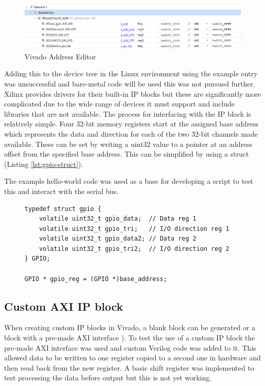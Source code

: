 \begin{figure}[H]
	\centering
	\includegraphics[scale=0.6]{address_editor.png}
	\caption{Vivado Address Editor}
	\label{fig:address_editor}
\end{figure}

Adding this to the device tree in the Linux environment using the example entry was unsuccessful and bare-metal code will be used this was not pursued further. Xilinx provides drivers \cite{xilinx_gpio_driver} for their built-in IP blocks but these are significantly more complicated due to the wide range of devices it must support and include libraries that are not available. The process for interfacing with the IP block is relatively simple. Four 32-bit memory registers start at the assigned base address which represents the data and direction for each of the two 32-bit channels made available. These can be set by writing a uint32 value to a pointer at an address offset from the specified base address. This can be simplified by using a struct (Listing \ref{lst:gpio-struct}).

The example hello-world code was used as a base for developing a script to test this and interact with the serial bus.

\begin{figure}[h]
\begin{lstlisting}[style=CStyle, caption={Definition of a structure to access virtual memory addresses.}, label={lst:gpio-struct}]
typedef struct gpio {
	volatile uint32_t gpio_data;  // Data reg 1
	volatile uint32_t gpio_tri;   // I/O direction reg 1
	volatile uint32_t gpio_data2; // Data reg 2
	volatile uint32_t gpio_tri2;  // I/O direction reg 2
} GPIO;

GPIO * gpio_reg = (GPIO *)base_address;
\end{lstlisting}
\end{figure}

\subsection{Custom AXI IP block}
When creating custom IP blocks in Vivado, a blank block can be generated or a block with a pre-made AXI interface \cite{xilinx_axiip}). To test the use of a custom IP block the pre-made AXI interface was used and custom Verilog code was added to it. This allowed data to be written to one register copied to a second one in hardware and then read back from the new register. A basic shift register was implemented to test processing the data before output but this is not yet working.

